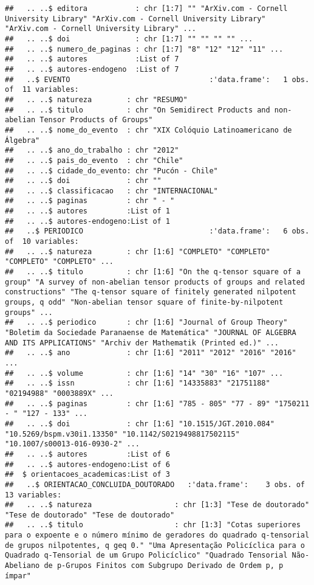 \documentclass[]{article}
\begin{document}
\begin{verbatim}
##   .. ..$ editora           : chr [1:7] "" "ArXiv.com - Cornell University Library" "ArXiv.com - Cornell University Library" "ArXiv.com - Cornell University Library" ...
##   .. ..$ doi               : chr [1:7] "" "" "" "" ...
##   .. ..$ numero_de_paginas : chr [1:7] "8" "12" "12" "11" ...
##   .. ..$ autores           :List of 7
##   .. ..$ autores-endogeno  :List of 7
##   ..$ EVENTO                                :'data.frame':   1 obs. of  11 variables:
##   .. ..$ natureza        : chr "RESUMO"
##   .. ..$ titulo          : chr "On Semidirect Products and non-abelian Tensor Products of Groups"
##   .. ..$ nome_do_evento  : chr "XIX Colóquio Latinoamericano de Álgebra"
##   .. ..$ ano_do_trabalho : chr "2012"
##   .. ..$ pais_do_evento  : chr "Chile"
##   .. ..$ cidade_do_evento: chr "Pucón - Chile"
##   .. ..$ doi             : chr ""
##   .. ..$ classificacao   : chr "INTERNACIONAL"
##   .. ..$ paginas         : chr " - "
##   .. ..$ autores         :List of 1
##   .. ..$ autores-endogeno:List of 1
##   ..$ PERIODICO                             :'data.frame':   6 obs. of  10 variables:
##   .. ..$ natureza        : chr [1:6] "COMPLETO" "COMPLETO" "COMPLETO" "COMPLETO" ...
##   .. ..$ titulo          : chr [1:6] "On the q-tensor square of a group" "A survey of non-abelian tensor products of groups and related constructions" "The q-tensor square of finitely generated nilpotent groups, q odd" "Non-abelian tensor square of finite-by-nilpotent groups" ...
##   .. ..$ periodico       : chr [1:6] "Journal of Group Theory" "Boletim da Sociedade Paranaense de Matemática" "JOURNAL OF ALGEBRA AND ITS APPLICATIONS" "Archiv der Mathematik (Printed ed.)" ...
##   .. ..$ ano             : chr [1:6] "2011" "2012" "2016" "2016" ...
##   .. ..$ volume          : chr [1:6] "14" "30" "16" "107" ...
##   .. ..$ issn            : chr [1:6] "14335883" "21751188" "02194988" "0003889X" ...
##   .. ..$ paginas         : chr [1:6] "785 - 805" "77 - 89" "1750211 - " "127 - 133" ...
##   .. ..$ doi             : chr [1:6] "10.1515/JGT.2010.084" "10.5269/bspm.v30i1.13350" "10.1142/S0219498817502115" "10.1007/s00013-016-0930-2" ...
##   .. ..$ autores         :List of 6
##   .. ..$ autores-endogeno:List of 6
##  $ orientacoes_academicas:List of 3
##   ..$ ORIENTACAO_CONCLUIDA_DOUTORADO   :'data.frame':    3 obs. of  13 variables:
##   .. ..$ natureza                   : chr [1:3] "Tese de doutorado" "Tese de doutorado" "Tese de doutorado"
##   .. ..$ titulo                     : chr [1:3] "Cotas superiores para o expoente e o número mínimo de geradores do quadrado q-tensorial de grupos nilpotentes, q geq 0." "Uma Apresentação Policíclica para o Quadrado q-Tensorial de um Grupo Policíclico" "Quadrado Tensorial Não-Abeliano de p-Grupos Finitos com Subgrupo Derivado de Ordem p, p ímpar"

\end{verbatim}
\end{document}

